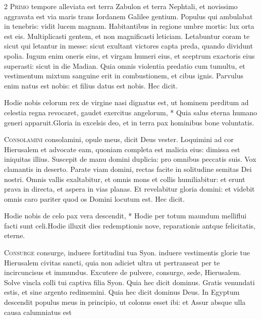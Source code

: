 \begin{multicols*}{2}
\lettrine[lines=2]{\zallmancaps \color{Red} P}{rimo} tempore alleviata est terra Zabulon et terra Nephtali, et novissimo aggravata est via maris trans Iordanem Galilee gentium. Populus qui ambulabat in tenebris: vidit lucem magnam. Habitantibus in regione umbre mortis: lux orta est eis. Multiplicasti gentem, et non magnificasti leticiam. Letabuntur coram te sicut qui letantur in messe: sicut exultant victores capta preda, quando dividunt spolia. Iugum enim oneris eius, et virgam humeri eius, et sceptrum exactoris eius superasti: sicut in die Madian. Quia omnis violentia predatio cum tumultu, et vestimentum mixtum sanguine erit in combustionem, et cibus ignis. Parvulus enim natus est nobis: et filius datus est nobis. Hec dicit.
\begin{responsory}
{Hodie nobis celorum rex de virgine nasi dignatus est, ut hominem perditum ad celestia regna revocaret, gaudet exercitus angelorum, * Quia salus eterna humano generi apparuit.}{Gloria in excelsis deo, et in terra pax hominibus bone voluntatis.}
\end{responsory}%
\lettrine[lines=2]{\zallmancaps \color{Blue} C}{onsolamini} consolamini, opule meus, dicit Deus vester. Loquimini ad cor Hierusalem et advocate eam, quoniam completa est malicia eius: dimissa est iniquitas illius. Suscepit de manu domini duplicia: pro omnibus peccatis suis. Vox clamantis in deserto. Parate viam domini, rectas facite in solitudine semitas Dei nostri. Omnis vallis exaltabitur, et omnis mons et collis humiliabitur: et erunt prava in directa, et aspera in vias planas. Et revelabitur gloria domini: et videbit omnis caro pariter quod os Domini locutum est. Hec dicit.
\begin{responsory}
{Hodie nobis de celo pax vera descendit, * Hodie per totum maundum melliflui facti sunt celi.}{Hodie illuxit dies redemptionis nove, reparationis antque felicitatis, eterne.}
\end{responsory}%
\lettrine[lines=2]{\zallmancaps \color{Red} C}{onsurge} consurge, induere fortitudini tua Syon. induere vestimentis glorie tue Hierusalem civitas sancti, quia non adiciet ultra ut pertranseat per te incircuncisus et immundus. Excutere de pulvere, consurge, sede, Hierusalem. Solve vincla colli tui captiva filia Syon. Quia hec dicit dominus. Gratis venundati estis, et sine argento redimemini. Quia hec dicit dominus Deus. In Egyptum descendit populus meus in principio, ut colonus esset ibi: et Assur absque ulla causa calumniatus est

\end{multicols*}
